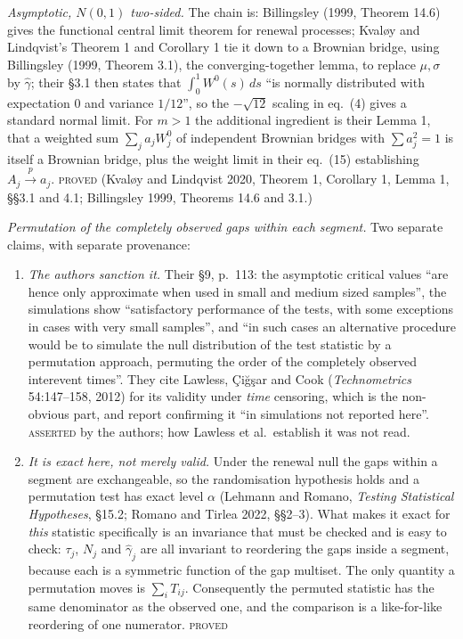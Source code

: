 \documentclass[11pt,a4paper]{article}
\newcommand{\Wbridge}{W^{0}}
\newcommand{\gh}{\hat\gamma}
\newcommand{\PROVED}{\textsc{\textcolor{blue!55!black}{proved}}}
\newcommand{\ASSERTED}{\textsc{\textcolor{purple!70!black}{asserted}}}
\begin{document}
\emph{Asymptotic, $N(0,1)$ two-sided.} The chain is: Billingsley (1999, Theorem 14.6)
gives the functional central limit theorem for renewal processes; Kvaløy and Lindqvist's
Theorem 1 and Corollary 1 tie it down to a Brownian bridge, using Billingsley (1999,
Theorem 3.1), the converging-together lemma, to replace $\mu,\sigma$ by $\gh$; their
\S 3.1 then states that $\int_0^1 \Wbridge(s)\,ds$ \enquote{is normally distributed with
expectation 0 and variance $1/12$}, so the $-\sqrt{12}$ scaling in eq.~(4) gives a
standard normal limit. For $m>1$ the additional ingredient is their Lemma 1, that a
weighted sum $\sum_j a_j W_j^0$ of independent Brownian bridges with $\sum a_j^2 = 1$ is
itself a Brownian bridge, plus the weight limit in their eq.~(15) establishing
$A_j \xrightarrow{p} a_j$. \PROVED{} (Kvaløy and Lindqvist 2020, Theorem 1, Corollary 1,
Lemma 1, \S\S 3.1 and 4.1; Billingsley 1999, Theorems 14.6 and 3.1.)

\emph{Permutation of the completely observed gaps within each segment.} Two separate
claims, with separate provenance:

\begin{enumerate}[leftmargin=1.6em,itemsep=2pt]
\item \emph{The authors sanction it.} Their \S 9, p.~113: the asymptotic critical values
\enquote{are hence only approximate when used in small and medium sized samples}, the
simulations show \enquote{satisfactory performance of the tests, with some exceptions in
cases with very small samples}, and \enquote{in such cases an alternative procedure would
be to simulate the null
distribution of the test statistic by a permutation approach, permuting the order of the
completely observed interevent times}. They cite Lawless, Çiğşar and Cook
(\emph{Technometrics} 54:147--158, 2012) for its validity under \emph{time} censoring,
which is the non-obvious part, and report confirming it \enquote{in simulations not reported
here}. \ASSERTED{} by the authors; how Lawless et al.\ establish it was not read.
\item \emph{It is exact here, not merely valid.} Under the renewal null the gaps within a
segment are exchangeable, so the randomisation hypothesis holds and a permutation test
has exact level $\alpha$ (Lehmann and Romano, \emph{Testing Statistical Hypotheses},
\S 15.2; Romano and Tirlea 2022, \S\S 2--3). What makes it exact for \emph{this}
statistic specifically is an invariance that must be checked and is easy to check:
$\tau_j$, $N_j$ and $\gh_j$ are all invariant to reordering the gaps inside a segment,
because each is a symmetric function of the gap multiset. The only quantity a permutation
moves is $\sum_i T_{ij}$. Consequently the permuted statistic has the same denominator as
the observed one, and the comparison is a like-for-like reordering of one numerator.
\PROVED
\end{enumerate}
\end{document}
